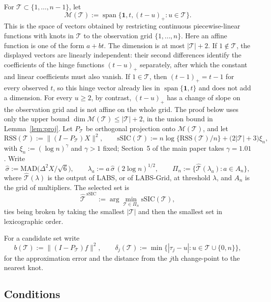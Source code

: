 \documentclass[12pt, a4paper]{article}
\begin{document}
For $\mathcal{T}\subset\{1,\ldots,n-1\}$, let
\[
\mathcal{M}(\mathcal{T})
:=\operatorname{span}\big\{\mathbf 1,t,(t-u)_+:u\in\mathcal{T}\big\}.
\]
This is the space of vectors obtained by restricting continuous
piecewise-linear functions with knots in $\mathcal{T}$ to the observation grid
$\{1,\ldots,n\}$. Here an affine function is one of the form $a+bt$. The
dimension is at most $|\mathcal{T}|+2$. If $1\notin\mathcal{T}$, the displayed
vectors are linearly independent: their second differences identify the
coefficients of the hinge functions $(t-u)_+$ separately, after which the
constant and linear coefficients must also vanish. If $1\in\mathcal{T}$, then
$(t-1)_+=t-1$ for every observed $t$, so this hinge vector already lies in
$\operatorname{span}\{\mathbf 1,t\}$ and does not add a dimension. For every
$u\ge2$, by contrast, $(t-u)_+$ has a change of slope on the observation grid
and is not affine on the whole grid. The proof
below uses only the upper bound $\dim\mathcal{M}(\mathcal{T})\le
|\mathcal{T}|+2$, in the union bound in Lemma~\ref{lem:proj}. Let
$P_{\mathcal{T}}$ be orthogonal projection onto
$\mathcal{M}(\mathcal{T})$, and let
\[
\mathrm{RSS}(\mathcal{T}) := \big\| (I - P_{\mathcal{T}}) X \big\|^2 ,
\qquad
\mathrm{sSIC}(\mathcal{T}) := n \log\{\mathrm{RSS}(\mathcal{T})/n\}
+ \big(2|\mathcal{T}|+3\big) \xi_n ,
\]
with $\xi_n := (\log n)^{\gamma}$ and $\gamma > 1$ fixed; Section~5 of the main
paper takes $\gamma = 1.01$. Write
\[
\hat\sigma := \mathrm{MAD}\big(\Delta^2 X / \sqrt6\big),
\qquad
\lambda_a := a\, \hat\sigma\, (2\log n)^{1/2},
\qquad
\Pi_n := \big\{ \hat{\mathcal{T}}(\lambda_a) : a \in A_n \big\},
\]
where $\hat{\mathcal{T}}(\lambda)$ is the output of LABS, or of LABS-Grid, at
threshold $\lambda$, and $A_n$ is the grid of multipliers. The selected set is
\[
\hat{\mathcal{T}}^{\,\mathrm{sSIC}} := \arg\min_{\mathcal{T} \in \Pi_n}
\mathrm{sSIC}(\mathcal{T}),
\]
ties being broken by taking the smallest $|\mathcal{T}|$ and then the smallest
set in lexicographic order.

For a candidate set write
\[
b(\mathcal{T}) := \big\| (I - P_{\mathcal{T}}) f \big\|^2 ,
\qquad
\delta_j(\mathcal{T}) := \min\big\{ |\tau_j - u| : u \in \mathcal{T} \cup
\{0,n\} \big\} ,
\]
for the approximation error and the distance from the $j$th change-point to the
nearest knot.

\subsection{Conditions}
\label{sup:ssiccond}
\end{document}
